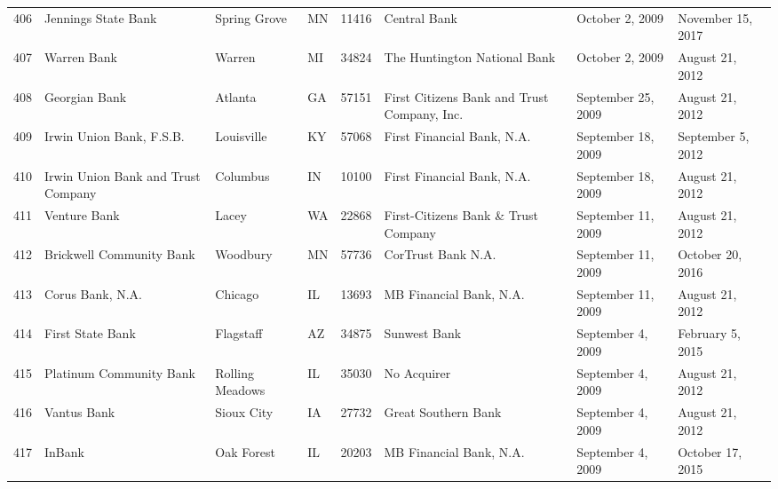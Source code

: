 \begin{tabular}{llllrlll}
406 &                                Jennings State Bank &        Spring Grove &  MN &  11416 &                                       Central Bank &     October 2, 2009 &   November 15, 2017 \\
407 &                                        Warren Bank &              Warren &  MI &  34824 &                       The Huntington National Bank &     October 2, 2009 &     August 21, 2012 \\
408 &                                      Georgian Bank &             Atlanta &  GA &  57151 &        First Citizens Bank and Trust Company, Inc. &  September 25, 2009 &     August 21, 2012 \\
409 &                           Irwin Union Bank, F.S.B. &          Louisville &  KY &  57068 &                         First Financial Bank, N.A. &  September 18, 2009 &   September 5, 2012 \\
410 &                 Irwin Union Bank and Trust Company &            Columbus &  IN &  10100 &                         First Financial Bank, N.A. &  September 18, 2009 &     August 21, 2012 \\
411 &                                       Venture Bank &               Lacey &  WA &  22868 &                First-Citizens Bank \& Trust Company &  September 11, 2009 &     August 21, 2012 \\
412 &                           Brickwell Community Bank &            Woodbury &  MN &  57736 &                                 CorTrust Bank N.A. &  September 11, 2009 &    October 20, 2016 \\
413 &                                   Corus Bank, N.A. &             Chicago &  IL &  13693 &                            MB Financial Bank, N.A. &  September 11, 2009 &     August 21, 2012 \\
414 &                                   First State Bank &           Flagstaff &  AZ &  34875 &                                       Sunwest Bank &   September 4, 2009 &    February 5, 2015 \\
415 &                            Platinum Community Bank &     Rolling Meadows &  IL &  35030 &                                        No Acquirer &   September 4, 2009 &     August 21, 2012 \\
416 &                                        Vantus Bank &          Sioux City &  IA &  27732 &                                Great Southern Bank &   September 4, 2009 &     August 21, 2012 \\
417 &                                             InBank &          Oak Forest &  IL &  20203 &                            MB Financial Bank, N.A. &   September 4, 2009 &    October 17, 2015 \\

\end{tabular}
